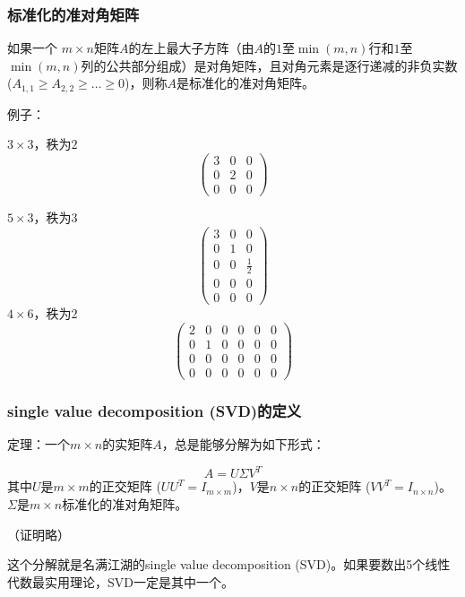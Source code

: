 \documentclass[CJK]{beamer}
\begin{document}
  \begin{frame}
    \frametitle{标准化的准对角矩阵}
    如果一个 $m\times n$矩阵$A$的左上最大子方阵（由$A$的$1$至$\min(m, n)$行和$1$至$\min(m, n)$列的公共部分组成）是对角矩阵，且对角元素是逐行递减的非负实数($A_{1,1}\ge A_{2,2}\ge \ldots\ge 0$)，则称$A$是{\blue 标准化的准对角矩阵}。

    \skiplines

    例子：
    
    \bcenter
    $3\times 3$，秩为$2$
    \ecenter
   \begin{equation}\left(\begin{array}{lll}
    3 & 0 & 0 \\
    0 & 2 & 0 \\
    0 & 0 & 0 
     \end{array}\right)\nonumber\end{equation}

     \vspace{0.2in}
    \emini    
    \bcenter
    $5\times 3$，秩为$3$
    \ecenter
   \begin{equation}\left(\begin{array}{lll}
    3 & 0 & 0 \\
    0 & 1 & 0 \\
    0 & 0 & \frac{1}{2} \\
    0 & 0 & 0 \\
    0 & 0 & 0                         
     \end{array}\right)\nonumber\end{equation}
    \emini
    \bcenter
    $4\times 6$，秩为$2$    
    \ecenter
   \begin{equation}\left(\begin{array}{llllll}
     2 & 0 & 0 & 0 & 0 & 0 \\
    0 & 1 & 0 & 0  & 0 & 0 \\
    0 & 0 & 0 & 0  & 0 & 0 \\
    0 & 0 & 0 & 0  & 0 & 0    
     \end{array}\right)\nonumber\end{equation}

     \vspace{0.1in}     
       \emini
    
  \end{frame}


    \begin{frame}
    \frametitle{single value decomposition (SVD)的定义}

    定理：一个$m\times n$的实矩阵$A$，总是能够分解为如下形式：

    $$ A = U \Sigma V^T $$
    其中$U$是$m\times m$的正交矩阵 ($U U^T = I_{m\times m}$)，$V$是$n\times n$的正交矩阵 ($VV^T = I_{n\times n}$)。$\Sigma$是$m\times n$标准化的准对角矩阵。

    （证明略）

    \skipline
    
    这个分解就是名满江湖的single value decomposition ({\blue SVD})。如果要数出5个线性代数最实用理论，SVD一定是其中一个。
    \end{frame}
\end{document}

